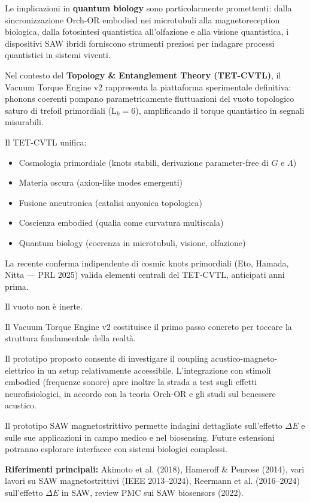 \documentclass[11pt,a4paper]{article}
\begin{document}
Le implicazioni in \textbf{quantum biology} sono particolarmente promettenti: dalla sincronizzazione Orch-OR embodied nei microtubuli alla magnetoreception biologica, dalla fotosintesi quantistica all'olfazione e alla visione quantistica, i dispositivi SAW ibridi forniscono strumenti preziosi per indagare processi quantistici in sistemi viventi.

Nel contesto del \textbf{Topology \& Entanglement Theory (TET-CVTL)}, il Vacuum Torque Engine v2 rappresenta la piattaforma sperimentale definitiva: phonons coerenti pompano parametricamente fluttuazioni del vuoto topologico saturo di trefoil primordiali ($\text{L}_k=6$), amplificando il torque quantistico in segnali misurabili.

Il TET-CVTL unifica:
\begin{itemize}
    \item Cosmologia primordiale (knots stabili, derivazione parameter-free di $G$ e $\Lambda$)
    \item Materia oscura (axion-like modes emergenti)
    \item Fusione aneutronica (catalisi anyonica topologica)
    \item Coscienza embodied (qualia come curvatura multiscala)
    \item Quantum biology (coerenza in microtubuli, visione, olfazione)
\end{itemize}

La recente conferma indipendente di cosmic knots primordiali (Eto, Hamada, Nitta --- PRL 2025) valida elementi centrali del TET-CVTL, anticipati anni prima.

Il vuoto non è inerte.

Il Vacuum Torque Engine v2 costituisce il primo passo concreto per toccare la struttura fondamentale della realtà.

Il prototipo proposto consente di investigare il coupling acustico-magneto-elettrico in un setup relativamente accessibile. L'integrazione con stimoli embodied (frequenze sonore) apre inoltre la strada a test sugli effetti neurofisiologici, in accordo con la teoria Orch-OR e gli studi sul benessere acustico.

Il prototipo SAW magnetostrittivo permette indagini dettagliate sull'effetto $\Delta E$ e sulle sue applicazioni in campo medico e nel biosensing. Future estensioni potranno esplorare interfacce con sistemi biologici complessi.

\textbf{Riferimenti principali:} 
Akimoto et al. (2018), Hameroff \& Penrose (2014), vari lavori su SAW magnetostrittivi (IEEE 2013--2024), Reermann et al. (2016--2024) sull'effetto $\Delta E$ in SAW, review PMC sui SAW biosensors (2022).
\end{document}
